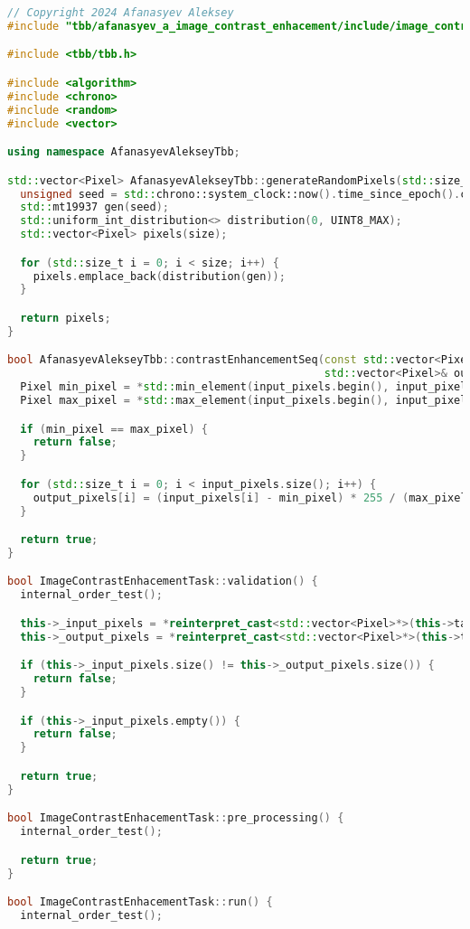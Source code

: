 \documentclass{report}
\begin{document}
\begin{lstlisting}[language=C++,caption=TBB версия]
// Copyright 2024 Afanasyev Aleksey
#include "tbb/afanasyev_a_image_contrast_enhacement/include/image_contrast_enhacement_task.hpp"

#include <tbb/tbb.h>

#include <algorithm>
#include <chrono>
#include <random>
#include <vector>

using namespace AfanasyevAlekseyTbb;

std::vector<Pixel> AfanasyevAlekseyTbb::generateRandomPixels(std::size_t size) {
  unsigned seed = std::chrono::system_clock::now().time_since_epoch().count();
  std::mt19937 gen(seed);
  std::uniform_int_distribution<> distribution(0, UINT8_MAX);
  std::vector<Pixel> pixels(size);

  for (std::size_t i = 0; i < size; i++) {
    pixels.emplace_back(distribution(gen));
  }

  return pixels;
}

bool AfanasyevAlekseyTbb::contrastEnhancementSeq(const std::vector<Pixel>& input_pixels,
                                                 std::vector<Pixel>& output_pixels) {
  Pixel min_pixel = *std::min_element(input_pixels.begin(), input_pixels.end());
  Pixel max_pixel = *std::max_element(input_pixels.begin(), input_pixels.end());

  if (min_pixel == max_pixel) {
    return false;
  }

  for (std::size_t i = 0; i < input_pixels.size(); i++) {
    output_pixels[i] = (input_pixels[i] - min_pixel) * 255 / (max_pixel - min_pixel);
  }

  return true;
}

bool ImageContrastEnhacementTask::validation() {
  internal_order_test();

  this->_input_pixels = *reinterpret_cast<std::vector<Pixel>*>(this->taskData->inputs[0]);
  this->_output_pixels = *reinterpret_cast<std::vector<Pixel>*>(this->taskData->outputs[0]);

  if (this->_input_pixels.size() != this->_output_pixels.size()) {
    return false;
  }

  if (this->_input_pixels.empty()) {
    return false;
  }

  return true;
}

bool ImageContrastEnhacementTask::pre_processing() {
  internal_order_test();

  return true;
}

bool ImageContrastEnhacementTask::run() {
  internal_order_test();


\end{lstlisting}
\end{document}
